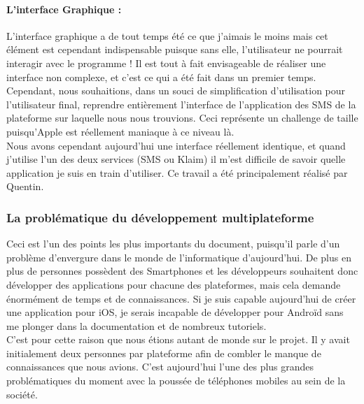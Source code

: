 \documentclass{article}
\begin{document}
		\paragraph{L'interface Graphique :}
		L'interface graphique a de tout temps été ce que j'aimais le moins mais cet élément est cependant indispensable puisque sans elle, l'utilisateur ne pourrait interagir avec le programme ! Il est tout à fait envisageable de réaliser une interface non complexe, et c'est ce qui a été fait dans un premier temps. Cependant, nous souhaitions, dans un souci de simplification d'utilisation pour l'utilisateur final, reprendre entièrement l'interface de l'application des SMS de la plateforme sur laquelle nous nous trouvions. Ceci représente un challenge de taille puisqu'Apple est réellement maniaque à ce niveau là. \\
		
		Nous avons cependant aujourd'hui une interface réellement identique, et quand j'utilise l'un des deux services (SMS ou Klaim) il m'est difficile de savoir quelle application je suis en train d'utiliser. Ce travail a été principalement réalisé par Quentin.\\
		
\subsubsection{La problématique du développement multiplateforme}
		Ceci est l'un des points les plus importants du document, puisqu'il parle d'un problème d'envergure dans le monde de l'informatique d'aujourd'hui. De plus en plus de personnes possèdent des Smartphones et les développeurs souhaitent donc développer des applications pour chacune des plateformes, mais cela demande énormément de temps et de connaissances. Si je suis capable aujourd'hui de créer une application pour iOS, je serais incapable de développer pour Androïd sans me plonger dans la documentation et de nombreux tutoriels. \\
		
		C'est pour cette raison que nous étions autant de monde sur le projet. Il y avait initialement deux personnes par plateforme afin de combler le manque de connaissances que nous avions.  C'est aujourd'hui l'une des plus grandes problématiques du moment avec la poussée de téléphones mobiles au sein de la société. \\
		
\end{document}
